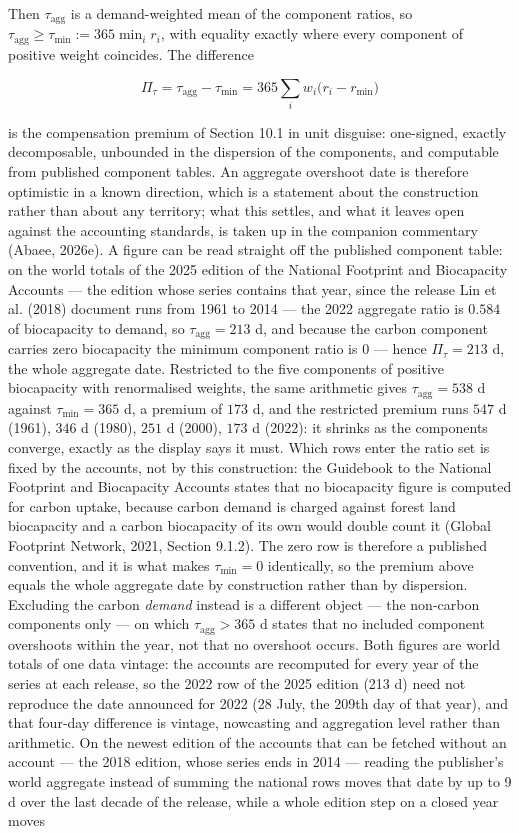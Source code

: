 \documentclass[11pt]{article}
\begin{document}
 Then \(\tau_{\mathrm{agg}}\) is a demand-weighted mean of the component ratios, so \(\tau_{\mathrm{agg}}\ge\tau_{\min}:=\allowbreak{}365\min_ir_i\), with equality exactly where every component of positive weight coincides. The difference 

$$\Pi_\tau=\tau_{\mathrm{agg}}-\tau_{\min}=365\sum_iw_i\bigl(r_i-r_{\min}\bigr)$$

 is the compensation premium of Section 10.1 in unit disguise: one-signed, exactly decomposable, unbounded in the dispersion of the components, and computable from published component tables. An aggregate overshoot date is therefore optimistic in a known direction, which is a statement about the construction rather than about any territory; what this settles, and what it leaves open against the accounting standards, is taken up in the companion commentary (Abaee, 2026e). A figure can be read straight off the published component table: on the world totals of the 2025 edition of the National Footprint and Biocapacity Accounts --- the edition whose series contains that year, since the release Lin et al. (2018) document runs from 1961 to 2014 --- the 2022 aggregate ratio is \(0.584\) of biocapacity to demand, so \(\tau_{\mathrm{agg}} = 213\) d, and because the carbon component carries zero biocapacity the minimum component ratio is \(0\) --- hence \(\Pi_\tau = 213\) d, the whole aggregate date. Restricted to the five components of positive biocapacity with renormalised weights, the same arithmetic gives \(\tau_{\mathrm{agg}} = 538\) d against \(\tau_{\min} = 365\) d, a premium of \(173\) d, and the restricted premium runs \(547\) d (1961), \(346\) d (1980), \(251\) d (2000), \(173\) d (2022): it shrinks as the components converge, exactly as the display says it must. Which rows enter the ratio set is fixed by the accounts, not by this construction: the Guidebook to the National Footprint and Biocapacity Accounts states that no biocapacity figure is computed for carbon uptake, because carbon demand is charged against forest land biocapacity and a carbon biocapacity of its own would double count it (Global Footprint Network, 2021, Section 9.1.2). The zero row is therefore a published convention, and it is what makes \(\tau_{\min} = 0\) identically, so the premium above equals the whole aggregate date by construction rather than by dispersion. Excluding the carbon \emph{demand} instead is a different object --- the non-carbon components only --- on which \(\tau_{\mathrm{agg}} > 365\) d states that no included component overshoots within the year, not that no overshoot occurs. Both figures are world totals of one data vintage: the accounts are recomputed for every year of the series at each release, so the 2022 row of the 2025 edition (213 d) need not reproduce the date announced for 2022 (28 July, the 209th day of that year), and that four-day difference is vintage, nowcasting and aggregation level rather than arithmetic. On the newest edition of the accounts that can be fetched without an account --- the 2018 edition, whose series ends in 2014 --- reading the publisher's world aggregate instead of summing the national rows moves that date by up to 9 d over the last decade of the release, while a whole edition step on a closed year moves 
\end{document}

